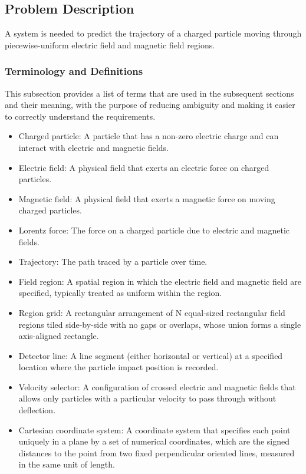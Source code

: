 \documentclass[12pt]{article}
\begin{document}
\subsection{Problem Description}
\label{Sec:ProbDesc}
A system is needed to predict the trajectory of a charged particle moving through piecewise-uniform electric field and magnetic field regions.

\subsubsection{Terminology and Definitions}
\label{Sec:TermDefs}
This subsection provides a list of terms that are used in the subsequent sections and their meaning, with the purpose of reducing ambiguity and making it easier to correctly understand the requirements.

\begin{itemize}
\item{Charged particle: A particle that has a non-zero electric charge and can interact with electric and magnetic fields.}
\item{Electric field: A physical field that exerts an electric force on charged particles.}
\item{Magnetic field: A physical field that exerts a magnetic force on moving charged particles.}
\item{Lorentz force: The force on a charged particle due to electric and magnetic fields.}
\item{Trajectory: The path traced by a particle over time.}
\item{Field region: A spatial region in which the electric field and magnetic field are specified, typically treated as uniform within the region.}
\item{Region grid: A rectangular arrangement of N equal-sized rectangular field regions tiled side-by-side with no gaps or overlaps, whose union forms a single axis-aligned rectangle.}
\item{Detector line: A line segment (either horizontal or vertical) at a specified location where the particle impact position is recorded.}
\item{Velocity selector: A configuration of crossed electric and magnetic fields that allows only particles with a particular velocity to pass through without deflection.}
\item{Cartesian coordinate system: A coordinate system that specifies each point uniquely in a plane by a set of numerical coordinates, which are the signed distances to the point from two fixed perpendicular oriented lines, measured in the same unit of length.}
\end{itemize}
\end{document}
